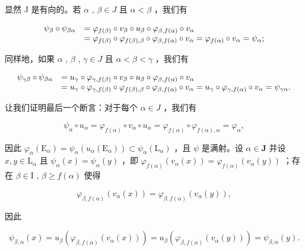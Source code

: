 显然 J 是有向的。若 \(\alpha\) , \(\beta \in J\) 且 \(\alpha < \beta\) ，我们有

\[
\begin{array}{r l} \psi_ {\beta} \circ \psi_ {\beta \alpha} & = \varphi_ {f (\beta)} \circ v _ {\beta} \circ u _ {\beta} \circ \varphi_ {\beta , f (\alpha)} \circ v _ {\alpha} \\ & = \varphi_ {f (\beta)} \circ \varphi_ {f (\beta), \beta} \circ \varphi_ {\beta , f (\alpha)} \circ v _ {\alpha} = \varphi_ {f (\alpha)} \circ v _ {\alpha} = \psi_ {\alpha}; \end{array}
\]

同样地，如果 \(\alpha\) , \(\beta\) , \(\gamma \in J\) 且 \(\alpha < \beta < \gamma\) ，我们有

\[
\begin{array}{r l} \psi_ {\gamma \beta} \circ \psi_ {\beta \alpha} & = u _ {\gamma} \circ \varphi_ {\gamma , f (\beta)} \circ v _ {\beta} \circ u _ {\beta} \circ \varphi_ {\beta , f (\alpha)} \circ v _ {\alpha} \\ & = u _ {\gamma} \circ \varphi_ {\gamma , f (\beta)} \circ \varphi_ {f (\beta), \beta} \circ \varphi_ {\beta , f (\alpha)} \circ v _ {\alpha} = u _ {\gamma} \circ \varphi_ {\gamma , f (\alpha)} \circ v _ {\alpha} = \psi_ {\gamma \alpha}. \end{array}
\]

让我们证明最后一个断言：对于每个 \(\alpha \in J\) ，我们有

\[
\psi_ {\alpha} \circ u _ {\alpha} = \varphi_ {f (\alpha)} \circ v _ {\alpha} \circ u _ {\alpha} = \varphi_ {f (\alpha)} \circ \varphi_ {f (\alpha), \alpha} = \varphi_ {\alpha},
\]

因此 \(\varphi_{\alpha}(\mathrm{E}_{\alpha}) = \psi_{\alpha}(u_{\alpha}(\mathrm{E}_{\alpha})) \subset \psi_{\alpha}(\mathrm{L}_{\alpha})\) ，且 \(\psi\) 是满射。设 \(\alpha \in \mathbf{J}\) 并设 \(x, y \in \mathrm{L}_{\alpha}\) 且 \(\psi_{\alpha}(x) = \psi_{\alpha}(y)\) ，即 \(\varphi_{f(\alpha)}(v_{\alpha}(x)) = \varphi_{f(\alpha)}(v_{\alpha}(y))\) ；存在 \(\beta \in \mathrm{I}\) , \(\beta \geqslant f(\alpha)\) 使得

\[
\varphi_ {\beta , f (\alpha)} (v _ {\alpha} (x)) = \varphi_ {\beta , f (\alpha)} (v _ {\alpha} (y)),
\]

因此

\[
\psi_ {\beta , \alpha} (x) = u _ {\beta} (\varphi_ {\beta , f (\alpha)} (v _ {\alpha} (x))) = u _ {\beta} (\varphi_ {\beta , f (\alpha)} (v _ {\alpha} (y))) = \psi_ {\beta , \alpha} (y).
\]

